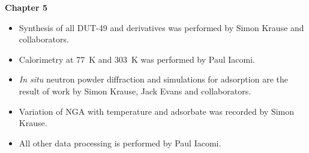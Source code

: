 {\textbf{Chapter 5}
\begin{itemize}
    \small
    \item Synthesis of all DUT-49 and derivatives was performed by 
    Simon Krause and collaborators.
    \item Calorimetry at \SI{77}{\kelvin} and \SI{303}{\kelvin} was
    performed by Paul Iacomi.
    \item \textit{In situ} neutron powder diffraction and simulations
    for  adsorption are the result of work by Simon Krause, 
    Jack Evans and collaborators.
    \item Variation of NGA with temperature and adsorbate was recorded
    by Simon Krause.
    \item All other data processing is performed by Paul Iacomi.
\end{itemize}
}